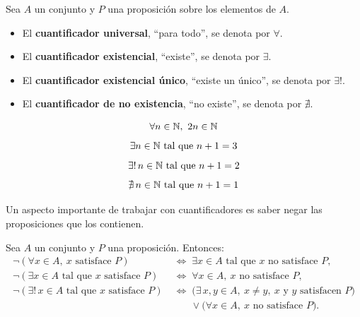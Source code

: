 \documentclass[12pt,a4paper]{book}
\begin{document}
    \begin{definicion}[Cuantificadores]
        Sea $A$ un conjunto y $P$ una proposición sobre los elementos de $A$.
        \begin{itemize}
            \item El \textbf{cuantificador universal}, ``para todo'', se denota por $\forall$.
            \item El \textbf{cuantificador existencial}, ``existe'', se denota por $\exists$.
            \item El \textbf{cuantificador existencial único}, ``existe un único'', se denota por $\exists!$.
            \item El \textbf{cuantificador de no existencia}, ``no existe'', se denota por $\nexists$.
        \end{itemize}
    \end{definicion}

    \begin{ejemplo}
        \begin{equation*}
            \forall n \in \mathbb{N},\ 2n \in \mathbb{N}
        \end{equation*}
        \begin{equation*}
            \exists n \in \mathbb{N} \text{ tal que } n+1=3
        \end{equation*}
        \begin{equation*}
            \exists! \, n \in \mathbb{N} \text{ tal que } n+1=2
        \end{equation*}
        \begin{equation*}
            \nexists\, n \in \mathbb{N} \text{ tal que } n+1=1
        \end{equation*}
    \end{ejemplo}

    Un aspecto importante de trabajar con cuantificadores es saber negar las proposiciones que los contienen.

    \begin{proposicion}
        Sea $A$ un conjunto y $P$ una proposición. Entonces:
        \begin{align*}
            \neg(\forall x\in A,\ x \text{ satisface } P)                    & \;\Longleftrightarrow\; \exists x\in A \text{ tal que } x \text{ no satisface } P,                    \\
            \neg(\exists x\in A \text{ tal que } x \text{ satisface } P)     & \;\Longleftrightarrow\; \forall x\in A,\ x \text{ no satisface } P,                                   \\
            \neg(\exists! \, x\in A \text{ tal que } x \text{ satisface } P) & \;\Longleftrightarrow\; \big(\exists\, x,y\in A,\ x\neq y,\ x \text{ y } y \text{ satisfacen } P\big) \\
                                                                             & \qquad \vee \big(\forall x\in A,\ x \text{ no satisface } P\big).
        \end{align*}
    \end{proposicion}
\end{document}
